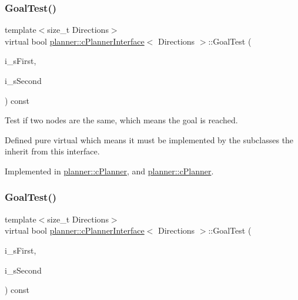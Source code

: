 \subsubsection{\texorpdfstring{Goal\+Test()}{GoalTest()}\hspace{0.1cm}{\footnotesize\ttfamily [1/2]}}
{\footnotesize\ttfamily template$<$size\+\_\+t Directions$>$ \\
virtual bool \mbox{\hyperlink{classplanner_1_1c_planner_interface}{planner\+::c\+Planner\+Interface}}$<$ Directions $>$\+::Goal\+Test (\begin{DoxyParamCaption}\item[{std\+::shared\+\_\+ptr$<$ \mbox{\hyperlink{structplanner_1_1t_node}{t\+Node}} $>$ \&}]{i\+\_\+s\+First,  }\item[{std\+::shared\+\_\+ptr$<$ \mbox{\hyperlink{structplanner_1_1t_node}{t\+Node}} $>$ \&}]{i\+\_\+s\+Second }\end{DoxyParamCaption}) const\hspace{0.3cm}{\ttfamily [pure virtual]}}



Test if two nodes are the same, which means the goal is reached. 

Defined pure virtual which means it must be implemented by the subclasses the inherit from this interface. 

Implemented in \mbox{\hyperlink{classplanner_1_1c_planner_a6b7554394efd7ad10d76a49b370aa62f}{planner\+::c\+Planner}}, and \mbox{\hyperlink{classplanner_1_1c_planner_a7050795c7174d0ec427fc91f8756a3d8}{planner\+::c\+Planner}}.

\mbox{\label{classplanner_1_1c_planner_interface_afec836d58ce54c49046bf30ecdebbfec}} 
\subsubsection{\texorpdfstring{Goal\+Test()}{GoalTest()}\hspace{0.1cm}{\footnotesize\ttfamily [2/2]}}
{\footnotesize\ttfamily template$<$size\+\_\+t Directions$>$ \\
virtual bool \mbox{\hyperlink{classplanner_1_1c_planner_interface}{planner\+::c\+Planner\+Interface}}$<$ Directions $>$\+::Goal\+Test (\begin{DoxyParamCaption}\item[{std\+::shared\+\_\+ptr$<$ \mbox{\hyperlink{structplanner_1_1t_node}{t\+Node}} $>$ \&}]{i\+\_\+s\+First,  }\item[{std\+::shared\+\_\+ptr$<$ \mbox{\hyperlink{structplanner_1_1t_node}{t\+Node}} $>$ \&}]{i\+\_\+s\+Second }\end{DoxyParamCaption}) const\hspace{0.3cm}{\ttfamily [pure virtual]}}



